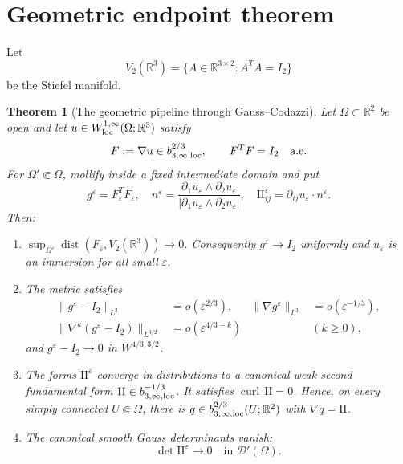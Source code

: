 \documentclass[11pt]{article}
\newtheorem{theorem}{Theorem}
\newcommand{\R}{\mathbb R}
\newcommand{\eps}{\varepsilon}
\newcommand{\dist}{\operatorname{dist}}
\newcommand{\curl}{\operatorname{curl}}
\begin{document}
\section*{Geometric endpoint theorem}

Let
\[
 V_2(\R^3)=\{A\in\R^{3\times2}:A^TA=I_2\}
\]
be the Stiefel manifold.

\begin{theorem}[The geometric pipeline through Gauss--Codazzi]\label{thm:geo}
Let $\Omega\subset\R^2$ be open and let
$u\in W^{1,\infty}_{\rm loc}(\Omega;\R^3)$ satisfy
\[
 F:=\nabla u\in b^{2/3}_{3,\infty,\rm loc},
 \qquad F^TF=I_2\quad\text{a.e.}
\]
For $\Omega'\Subset\Omega$, mollify inside a fixed intermediate domain and
put
\[
 g^\eps=F_\eps^TF_\eps,
 \quad n^\eps=\frac{\partial_1u_\eps\wedge\partial_2u_\eps}
 {|\partial_1u_\eps\wedge\partial_2u_\eps|},
 \quad \mathrm{II}^\eps_{ij}=\partial_{ij}u_\eps\cdot n^\eps.
\]
Then:
\begin{enumerate}
\item $\sup_{\Omega'}\dist(F_\eps,V_2(\R^3))\to0$.  Consequently
$g^\eps\to I_2$ uniformly and $u_\eps$ is an immersion for all small $\eps$.
\item The metric satisfies
\begin{align*}
 \|g^\eps-I_2\|_{L^3}&=o(\eps^{2/3}),&
 \|\nabla g^\eps\|_{L^3}&=o(\eps^{-1/3}),\\
 \|\nabla^k(g^\eps-I_2)\|_{L^{3/2}}
 &=o(\eps^{4/3-k})&&(k\geq0),
\end{align*}
and $g^\eps-I_2\to0$ in $W^{4/3,3/2}$.
\item The forms $\mathrm{II}^\eps$ converge in distributions to a canonical
weak second fundamental form
$\mathrm{II}\in b^{-1/3}_{3,\infty,\rm loc}$.  It satisfies
$\curl\,\mathrm{II}=0$.  Hence, on every simply connected
$U\Subset\Omega$, there is
$q\in b^{2/3}_{3,\infty,\rm loc}(U;\R^2)$ with
$\nabla q=\mathrm{II}$.
\item The canonical smooth Gauss determinants vanish:
\[
 \det\mathrm{II}^\eps\longrightarrow0
 \quad\text{in }\mathcal D'(\Omega).
\]
\end{enumerate}
\end{theorem}
\end{document}
